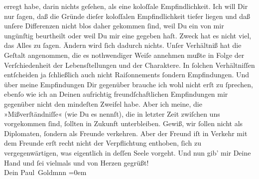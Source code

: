 \begin{ledgroupsized}[t]{13cm}
               erregt habe, darin nichts geſehen, als eine koloſſale Empfindlichkeit. Ich will Dir
               nur ſagen, daß die Gründe dieſer koloſſalen Empfindlichkeit tiefer liegen und daß
               unſere Differenzen nicht blos daher gekommen ſind, weil Du ein \label{K_L03194-11v}\label{K_L03194-11h} von mir ungünſtig beurtheilt  oder weil Du mir eine \label{K_L03194-12v}\label{K_L03194-12h} gegeben haſt.\pend
           \pstart
           Zweck hat es nicht viel, das Alles zu ſagen. Ändern wird ſich dadurch nichts. Unſer
               Verhältniß hat die Geſtalt angenommen, {\pb}die es
               nothwendiger Weiſe annehmen mußte in Folge der Verſchiedenheit der Lebensſtellungen
               und der Charaktere. In ſolchen Verhältniſſen entſcheiden ja ſchließlich auch nicht
               Raiſonnements ſondern Empfindungen. Und über meine Empfindungen Dir gegenüber brauche
               ich wohl nicht erſt zu ſprechen, ebenſo wie ich an Deinen aufrichtig
               freundſchaftlichen Empfindungen  mir gegenüber
               nicht den mindeſten Zweifel habe. Aber ich meine, die »Mißverſtändniſſe« (wie Du es
               nennſt), die in letzter Zeit zwiſchen uns vorgekommen ſind, ſollten in Zukunft
               unterbleiben. Gewiß, wir ſollen nicht als Diplomaten, ſondern als Freunde verkehren.
               Aber der Freund iſt in Verkehr mit dem Freunde erſt recht nicht
               der Verpflichtung enthoben, ſich zu vergegenwärtigen, was eigentlich in deſſen Seele
               vorgeht.\pend
           \pstart
           Und nun gib’ mir Deine Hand und ſei  vielmals
               und von Herzen gegrüßt! {\\[\baselineskip]}Dein \spacefill\mbox{Paul Goldmnn}\pend
           \leftskip=0em{}
         

\end{ledgroupsized}
